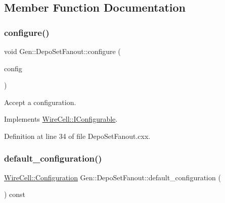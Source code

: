 \subsection{Member Function Documentation}
\mbox{\label{class_wire_cell_1_1_gen_1_1_depo_set_fanout_abe1609b06fc8b2b16b5f59dd8a724b85}} 
\subsubsection{\texorpdfstring{configure()}{configure()}}
{\footnotesize\ttfamily void Gen\+::\+Depo\+Set\+Fanout\+::configure (\begin{DoxyParamCaption}\item[{const \hyperlink{namespace_wire_cell_a9f705541fc1d46c608b3d32c182333ee}{Wire\+Cell\+::\+Configuration} \&}]{config }\end{DoxyParamCaption})\hspace{0.3cm}{\ttfamily [virtual]}}



Accept a configuration. 



Implements \hyperlink{class_wire_cell_1_1_i_configurable_a57ff687923a724093df3de59c6ff237d}{Wire\+Cell\+::\+I\+Configurable}.



Definition at line 34 of file Depo\+Set\+Fanout.\+cxx.

\mbox{\label{class_wire_cell_1_1_gen_1_1_depo_set_fanout_aedeec385e6327446f23c20c546535b5e}} 
\subsubsection{\texorpdfstring{default\+\_\+configuration()}{default\_configuration()}}
{\footnotesize\ttfamily \hyperlink{namespace_wire_cell_a9f705541fc1d46c608b3d32c182333ee}{Wire\+Cell\+::\+Configuration} Gen\+::\+Depo\+Set\+Fanout\+::default\+\_\+configuration (\begin{DoxyParamCaption}{ }\end{DoxyParamCaption}) const\hspace{0.3cm}{\ttfamily [virtual]}}



